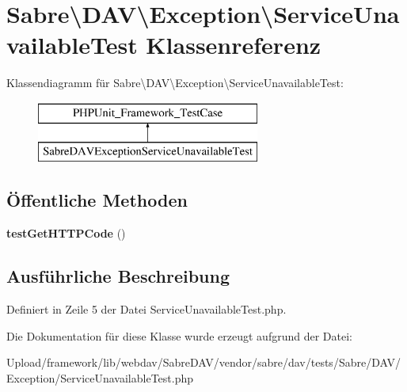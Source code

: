 \hypertarget{class_sabre_1_1_d_a_v_1_1_exception_1_1_service_unavailable_test}{}\section{Sabre\textbackslash{}D\+AV\textbackslash{}Exception\textbackslash{}Service\+Unavailable\+Test Klassenreferenz}
\label{class_sabre_1_1_d_a_v_1_1_exception_1_1_service_unavailable_test}
Klassendiagramm für Sabre\textbackslash{}D\+AV\textbackslash{}Exception\textbackslash{}Service\+Unavailable\+Test\+:\begin{figure}[H]
\begin{center}
\leavevmode
\includegraphics[height=2.000000cm]{class_sabre_1_1_d_a_v_1_1_exception_1_1_service_unavailable_test}
\end{center}
\end{figure}
\subsection*{Öffentliche Methoden}
\begin{DoxyCompactItemize}
\item 
\mbox{\label{class_sabre_1_1_d_a_v_1_1_exception_1_1_service_unavailable_test_aeeefc799820287bdf339d94fa8ab5c1a}} 
{\bfseries test\+Get\+H\+T\+T\+P\+Code} ()
\end{DoxyCompactItemize}


\subsection{Ausführliche Beschreibung}


Definiert in Zeile 5 der Datei Service\+Unavailable\+Test.\+php.



Die Dokumentation für diese Klasse wurde erzeugt aufgrund der Datei\+:\begin{DoxyCompactItemize}
\item 
Upload/framework/lib/webdav/\+Sabre\+D\+A\+V/vendor/sabre/dav/tests/\+Sabre/\+D\+A\+V/\+Exception/Service\+Unavailable\+Test.\+php\end{DoxyCompactItemize}
